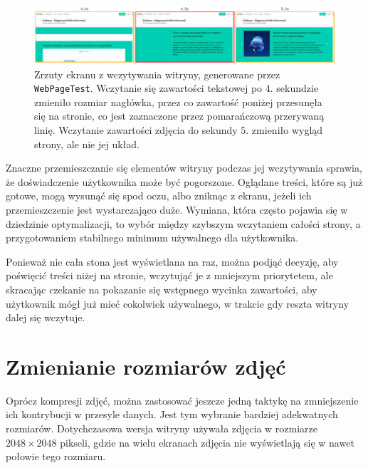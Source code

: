 \documentclass[licencjacka]{pracadypl}
\begin{document}
\begin{figure}[H]
  \includegraphics[width=\linewidth]{images/filmstrip.png}
  \caption{Zrzuty ekranu z wczytywania witryny, generowane przez \texttt{WebPageTest}. Wczytanie się zawartości tekstowej po $4.$ sekundzie zmieniło rozmiar nagłówka, przez co zawartość poniżej przesunęła się na stronie, co jest zaznaczone przez pomarańczową przerywaną linię. Wczytanie zawartości zdjęcia do sekundy $5.$ zmieniło wygląd strony, ale nie jej układ.}
  \label{fig:loading-layout-and-lcp}
\end{figure}

Znaczne przemieszczanie się elementów witryny podczas jej wczytywania sprawia, że doświadczenie użytkownika może być pogorszone. Oglądane treści, które są już gotowe, mogą wysunąć się spod oczu, albo zniknąc z ekranu, jeżeli ich przemieszczenie jest wystarczająco duże. Wymiana, która często pojawia się w dziedzinie optymalizacji, to wybór między szybszym wczytaniem całości strony, a przygotowaniem stabilnego minimum używalnego dla użytkownika. 

Ponieważ nie cała stona jest wyświetlana na raz, można podjąć decyzję, aby poświęcić treści niżej na stronie, wczytująć je z mniejszym priorytetem, ale skracając czekanie na pokazanie się wstępnego wycinka zawartości, aby użytkownik mógł już mieć cokolwiek używalnego, w trakcie gdy reszta witryny dalej się wczytuje.


\section{Zmienianie rozmiarów zdjęć}

Oprócz kompresji zdjęć, można zastosować jeszcze jedną taktykę na zmniejszenie ich kontrybucji w przesyle danych. Jest tym wybranie bardziej adekwatnych rozmiarów. Dotychczasowa wersja witryny używała zdjęcia w rozmiarze $2048\times2048$ pikseli, gdzie na wielu ekranach zdjęcia nie wyświetlają się w nawet połowie tego rozmiaru.
\end{document}
